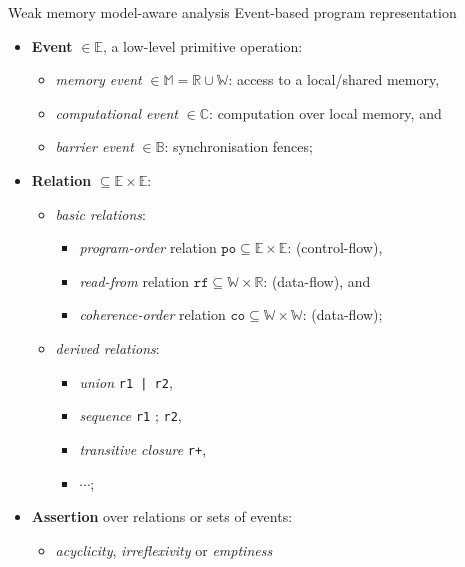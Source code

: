 \documentclass[aspectratio=149]{beamer}
\begin{document}
\begin{frame}{Weak memory model-aware analysis} {Event-based program representation}

\begin{itemize}
  \addtolength{\tabcolsep}{0pt}
  \item \textbf{Event} $\in \mathbb{E}$, a low-level primitive operation:
    \begin{itemize}
      \item \textit{memory event} $\in \mathbb{M} = \mathbb{R} \cup \mathbb{W}$: access to a local/shared memory, \\
      \item \textit{computational event} $\in \mathbb{C}$: computation over local memory, and \\
      \item \textit{barrier event} $\in \mathbb{B}$: synchronisation fences;
     \end{itemize}
  \item \textbf{Relation} $\subseteq \mathbb{E} \times \mathbb{E}$: 
    \begin{itemize}
    \item \textit{basic relations}:%
      \begin{itemize}
        \item \textit{program-order} relation $\texttt{po} \subseteq \mathbb{E} \times \mathbb{E}$: (control-flow),
        \item \textit{read-from} relation $\texttt{rf} \subseteq \mathbb{W} \times \mathbb{R}$: (data-flow), and
        \item \textit{coherence-order} relation $\texttt{co} \subseteq \mathbb{W} \times \mathbb{W}$: (data-flow);
      \end{itemize}
    \item \textit{derived relations}:%
      \begin{itemize}
        \item \textit{union} \texttt{r1\,|\,r2},
        \item \textit{sequence} \texttt{r1} ; \texttt{r2},
        \item \textit{transitive closure} \texttt{r+},
        \item $\cdots$;
      \end{itemize}
    \end{itemize}
  \item \textbf{Assertion} over relations or sets of events: 
    \begin{itemize}
    \item \textit{acyclicity}, \textit{irreflexivity} or \textit{emptiness} 
    \end{itemize}
\end{itemize}

\end{frame}
\end{document}
